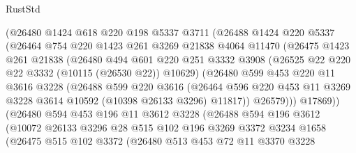 \begin{lexlean}{RustStd}
\begin{coremodule}
              (@26480
                @1424
                @618
                @220
                @198
                @5337
                @3711
                (@26488
                  @1424
                  @220
                  @5337
                  (@26464
                    @754
                    @220
                    @1423
                    @261
                    @3269
                    @21838
                    @4064
                    @11470
                    (@26475
                      @1423
                      @261
                      @21838
                      (@26480
                        @494
                        @601
                        @220
                        @251
                        @3332
                        @3908
                        (@26525 @22 @220 @22 @3332 (@10115 (@26530 @22)) @10629)
                        (@26480
                          @599
                          @453
                          @220
                          @11
                          @3616
                          @3228
                          (@26488
                            @599
                            @220
                            @3616
                            (@26464
                              @596
                              @220
                              @453
                              @11
                              @3269
                              @3228
                              @3614
                              @10592
                              (@10398 @26133 @3296)
                              @11817))
                          @26579)))
                    @17869))
                (@26480
                  @594
                  @453
                  @196
                  @11
                  @3612
                  @3228
                  (@26488
                    @594
                    @196
                    @3612
                    (@10072
                      @26133
                      @3296
                      @28
                      @515
                      @102
                      @196
                      @3269
                      @3372
                      @3234
                      @1658
                      (@26475
                        @515
                        @102
                        @3372
                        (@26480
                          @513
                          @453
                          @72
                          @11
                          @3370
                          @3228

\end{coremodule}
\end{lexlean}

